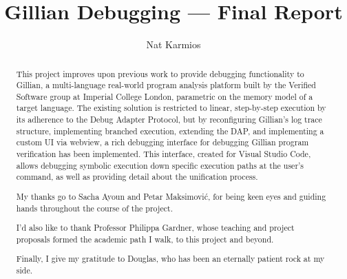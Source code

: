 \documentclass[a4paper, twoside]{report}
\title{Gillian Debugging --- Final Report}
\author{Nat Karmios}
\begin{document}
\def\chapterautorefname{\normalcolor{Chapter}\color{blue}}
\def\sectionautorefname{\normalcolor{\S}\kern-0.7ex\color{blue}}
\def\subsectionautorefname{\normalcolor{\S}\kern-0.7ex\color{blue}}
\def\figureautorefname{\normalcolor{Figure}\color{blue}}
\def\lstnumberautorefname{\normalcolor{line}\color{blue}}
\newcommand{\sacha}[1]{\todo[color=green]{S: {#1}}}



\begin{abstract}
This project improves upon previous work to provide debugging functionality to
Gillian, a multi-language real-world program analysis platform built by the
Verified Software group at Imperial College London, parametric on the memory
model of a target language.
The existing solution is restricted to linear, step-by-step execution by its
adherence to the Debug Adapter Protocol, but by reconfiguring Gillian's log
trace structure, implementing branched execution, extending the DAP, and
implementing a custom UI via webview, a rich debugging interface for debugging
Gillian program verification has been implemented.
This interface, created for Visual Studio Code, allows debugging symbolic
execution down specific execution paths at the user's command, as well as
providing detail about the unification process.
\end{abstract}

\renewcommand{\abstractname}{Acknowledgements}
\begin{abstract}
My thanks go to Sacha Ayoun and Petar Maksimović, for being keen eyes and
guiding hands throughout the course of the project.

I'd also like to thank Professor Philippa Gardner, whose teaching and project
proposals formed the academic path I walk, to this project and beyond.

Finally, I give my gratitude to Douglas, who has been an eternally patient rock
at my side.
\end{abstract}

\listoftodos{}
\tableofcontents










\end{document}
